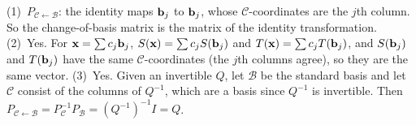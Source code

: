 \documentclass[11pt]{article}
\begin{document}
\begin{description}[leftmargin=0pt,itemsep=5pt]
  \item[Questions to think about.] (1)~$P_{\mathcal{C}\leftarrow\mathcal{B}}$: the identity maps $\mathbf{b}_j$ to $\mathbf{b}_j$, whose $\mathcal{C}$-coordinates are the $j$th column. So the change-of-basis matrix is the matrix of the identity transformation. (2)~Yes. For $\mathbf{x}=\sum c_j\mathbf{b}_j$, $S(\mathbf{x})=\sum c_jS(\mathbf{b}_j)$ and $T(\mathbf{x})=\sum c_jT(\mathbf{b}_j)$, and $S(\mathbf{b}_j)$ and $T(\mathbf{b}_j)$ have the same $\mathcal{C}$-coordinates (the $j$th columns agree), so they are the same vector. (3)~Yes. Given an invertible $Q$, let $\mathcal{B}$ be the standard basis and let $\mathcal{C}$ consist of the columns of $Q^{-1}$, which are a basis since $Q^{-1}$ is invertible. Then $P_{\mathcal{C}\leftarrow\mathcal{B}}=P_{\mathcal{C}}^{-1}P_{\mathcal{B}}=(Q^{-1})^{-1}I=Q$.
\end{description}
\end{document}

